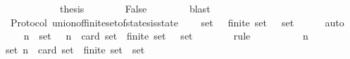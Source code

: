 \begin{isabellebody}
\ \ \ \ \isamarkupfalse%
\isanewline
\ \ \ \ \isamarkupfalse%
\ \isamarkupfalse%
\ {\isacharquery}thesis\isanewline
\ \ \ \ \ \ \isamarkupfalse%
\ False\ {\isacartoucheopen}{\isasymsigma}{}\ {\isasymin}\ {\isasymSigma}{\isacartoucheclose}\ {\isacartoucheopen}{\isasymsigma}{}\ {\isasymin}\ {\isasymSigma}{\isacartoucheclose}\ \isamarkupfalse%
\ blast\isanewline
\ \ \isamarkupfalse%
\isanewline
{}\isamarkupfalse%
%
\endisatagproof
{\isafoldproof}%
%
\isadelimproof
\isanewline
%
\endisadelimproof
\isanewline
\isanewline
{}\isamarkupfalse%
\ {\isacharparenleft}\ Protocol{\isacharparenright}\ union{\isacharunderscore}of{\isacharunderscore}finite{\isacharunderscore}set{\isacharunderscore}of{\isacharunderscore}states{\isacharunderscore}is{\isacharunderscore}state\ {\isacharcolon}\isanewline
\ \ {\isachardoublequoteopen}{\isasymforall}\ {\isasymsigma}{\isacharunderscore}set\ {\isasymsubseteq}\ {\isasymSigma}{\isachardot}\ finite\ {\isasymsigma}{\isacharunderscore}set\ {\isasymlongrightarrow}\ {\isasymUnion}\ {\isasymsigma}{\isacharunderscore}set\ {\isasymin}\ {\isasymSigma}{\isachardoublequoteclose}\isanewline
%
\isadelimproof
\ \ %
\endisadelimproof
%
\isatagproof
{}\isamarkupfalse%
\ auto\isanewline
{}\isamarkupfalse%
\ {\isacharminus}\isanewline
\ \ \isamarkupfalse%
\ {\isachardoublequoteopen}{\isasymforall}\ n{\isachardot}\ {\isasymforall}\ {\isasymsigma}{\isacharunderscore}set\ {\isasymsubseteq}\ {\isasymSigma}{\isachardot}\ n\ {\isacharequal}\ card\ {\isasymsigma}{\isacharunderscore}set\ {\isasymlongrightarrow}\ finite\ {\isasymsigma}{\isacharunderscore}set\ {\isasymlongrightarrow}\ {\isasymUnion}\ {\isasymsigma}{\isacharunderscore}set\ {\isasymin}\ {\isasymSigma}{\isachardoublequoteclose}\isanewline
\ \ \ \ \isamarkupfalse%
\ {\isacharparenleft}rule{\isacharparenright}\isanewline
\ \ \isamarkupfalse%
\ {\isacharminus}\isanewline
\ \ \ \ \isamarkupfalse%
\ n\isanewline
\ \ \ \ \isamarkupfalse%
\ {\isachardoublequoteopen}{\isasymforall}{\isasymsigma}{\isacharunderscore}set{\isasymsubseteq}{\isasymSigma}{\isachardot}\ n\ {\isacharequal}\ card\ {\isasymsigma}{\isacharunderscore}set\ {\isasymlongrightarrow}\ finite\ {\isasymsigma}{\isacharunderscore}set\ {\isasymlongrightarrow}\ {\isasymUnion}{\isasymsigma}{\isacharunderscore}set\ {\isasymin}\ {\isasymSigma}{\isachardoublequoteclose}\isanewline

\end{isabellebody}
